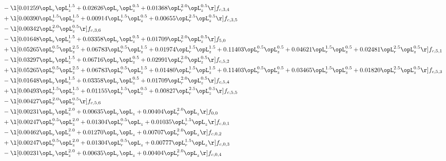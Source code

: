 \begin{alignat}{2}
& - \l[  0.01259 \opL_r \opL_z^{1.5} +  0.02626 \opL_r \opL_z^{0.5} +  0.01368 \opL_r^{2.0} \opL_z^{0.5}  \r] f_{c,3,4} \nonumber \\ 
& + \l[  0.00390 \opL_r^{1.5} \opL_z^{1.5} +  0.00914 \opL_r^{1.5} \opL_z^{0.5} +  0.00655 \opL_r^{2.5} \opL_z^{0.5}  \r] f_{c,3,5} \nonumber \\ 
& - \l[  0.00342 \opL_r^{2.0} \opL_z^{0.5}  \r] f_{c,3,6} \nonumber \\ 
& - \l[  0.01648 \opL_r \opL_z^{1.5} +  0.03358 \opL_r \opL_z^{0.5} +  0.01709 \opL_r^{2.0} \opL_z^{0.5}  \r] f_{5,0} \nonumber \\ 
& + \l[  0.05265 \opL_r^{0.5} \opL_z^{2.5} +  0.06783 \opL_r^{0.5} \opL_z^{1.5} +  0.01974 \opL_r^{1.5} \opL_z^{1.5} +  0.11403 \opL_r^{0.5} \opL_z^{0.5} +  0.04621 \opL_r^{1.5} \opL_z^{0.5} +  0.02481 \opL_r^{2.5} \opL_z^{0.5}  \r] f_{c,5,1} \nonumber \\ 
& - \l[  0.03297 \opL_r \opL_z^{1.5} +  0.06716 \opL_r \opL_z^{0.5} +  0.02991 \opL_r^{2.0} \opL_z^{0.5}  \r] f_{c,5,2} \nonumber \\ 
& + \l[  0.05265 \opL_r^{0.5} \opL_z^{2.5} +  0.06783 \opL_r^{0.5} \opL_z^{1.5} +  0.01480 \opL_r^{1.5} \opL_z^{1.5} +  0.11403 \opL_r^{0.5} \opL_z^{0.5} +  0.03465 \opL_r^{1.5} \opL_z^{0.5} +  0.01820 \opL_r^{2.5} \opL_z^{0.5}  \r] f_{c,5,3} \nonumber \\ 
& - \l[  0.01648 \opL_r \opL_z^{1.5} +  0.03358 \opL_r \opL_z^{0.5} +  0.01709 \opL_r^{2.0} \opL_z^{0.5}  \r] f_{c,5,4} \nonumber \\ 
& + \l[  0.00493 \opL_r^{1.5} \opL_z^{1.5} +  0.01155 \opL_r^{1.5} \opL_z^{0.5} +  0.00827 \opL_r^{2.5} \opL_z^{0.5}  \r] f_{c,5,5} \nonumber \\ 
& - \l[  0.00427 \opL_r^{2.0} \opL_z^{0.5}  \r] f_{c,5,6} \nonumber \\ 
& - \l[  0.00231 \opL_r \opL_z^{2.0} +  0.00635 \opL_r \opL_z +  0.00404 \opL_r^{2.0} \opL_z  \r] f_{0,0} \nonumber \\ 
& + \l[  0.00247 \opL_r^{0.5} \opL_z^{2.0} +  0.01304 \opL_r^{0.5} \opL_z +  0.01035 \opL_r^{1.5} \opL_z  \r] f_{c,0,1} \nonumber \\ 
& - \l[  0.00462 \opL_r \opL_z^{2.0} +  0.01270 \opL_r \opL_z +  0.00707 \opL_r^{2.0} \opL_z  \r] f_{c,0,2} \nonumber \\ 
& + \l[  0.00247 \opL_r^{0.5} \opL_z^{2.0} +  0.01304 \opL_r^{0.5} \opL_z +  0.00777 \opL_r^{1.5} \opL_z  \r] f_{c,0,3} \nonumber \\ 
& - \l[  0.00231 \opL_r \opL_z^{2.0} +  0.00635 \opL_r \opL_z +  0.00404 \opL_r^{2.0} \opL_z  \r] f_{c,0,4} \nonumber \\ 

\end{alignat}
